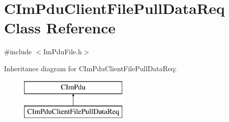\hypertarget{class_c_im_pdu_client_file_pull_data_req}{}\section{C\+Im\+Pdu\+Client\+File\+Pull\+Data\+Req Class Reference}
\label{class_c_im_pdu_client_file_pull_data_req}


{\ttfamily \#include $<$Im\+Pdu\+File.\+h$>$}

Inheritance diagram for C\+Im\+Pdu\+Client\+File\+Pull\+Data\+Req\+:\begin{figure}[H]
\begin{center}
\leavevmode
\includegraphics[height=2.000000cm]{class_c_im_pdu_client_file_pull_data_req}
\end{center}
\end{figure}
